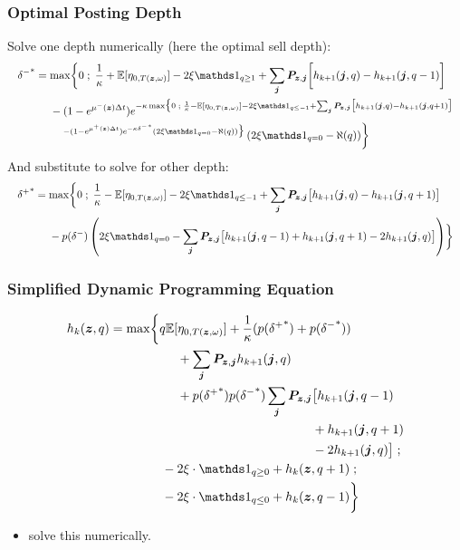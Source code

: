 \begin{frame}
\frametitle{Optimal Posting Depth}
Solve one depth numerically (here the optimal sell depth):
\[
\resizebox{\textwidth}{!}{$\displaystyle
\begin{aligned}
{\delta^-}^* & = \max \biggl\lbrace 0 \; ; \; \frac{1}{\kappa} + \E[\eta_{0,T(\bz, \omega)}] - 2 \xi \indicator_{q \geq 1} + \sum_{\bj} \bP_{\bz,\bj} \biggl[ h_{k+1}(\bj, q) - h_{k+1}(\bj, q-1) \biggr] \\
& \hphantom{{}={}} - (1-e^{\mu^-(\bz) \Delta t})e^{-\kappa \max \bigl\lbrace 0 \; ; \; \frac{1}{\kappa} - \E[\eta_{0,T(\bz, \omega)}] - 2 \xi \indicator_{q \leq -1} + \sum_{\bj} \bP_{\bz,\bj} \bigl[ h_{k+1}(\bj, q) - h_{k+1}(\bj, q+1) \bigr]} \\
& \hphantom{{}={} {}-{}} {}^{-(1-e^{\mu^+ (\bz) \Delta t})e^{-\kappa {\delta^-}^*} \left( 2 \xi \indicator_{q = 0} - \aleph(q) \right) \bigr\rbrace } \left( 2 \xi \indicator_{q = 0} - \aleph(q) \right) \biggr\rbrace
\end{aligned}
$}
\]
And substitute to solve for other depth:
\[
\resizebox{\textwidth}{!}{$\displaystyle 
\begin{aligned}
{\delta^+}^* & = \max \biggl\lbrace 0 \; ; \; \frac{1}{\kappa} - \E[\eta_{0,T(\bz, \omega)}] - 2 \xi \indicator_{q \leq -1} + \sum_{\bj} \bP_{\bz,\bj} \bigl[ h_{k+1}(\bj, q) - h_{k+1}(\bj, q+1) \bigr] \\
& \hphantom{{}={}} -p(\delta^-) \left( 2 \xi \indicator_{q = 0} - \sum_{\bj} \bP_{\bz,\bj} \bigl[ h_{k+1}(\bj, q-1) + h_{k+1}(\bj, q+1) -2 h_{k+1}(\bj, q)  \bigr] \right) \biggr\rbrace
\end{aligned}
$}
\]
\end{frame}

\begin{frame}
\frametitle{Simplified Dynamic Programming Equation}
\[
\begin{aligned}
h_k(\bz,q) & = \max \biggl\lbrace 
q\E[\eta_{0,T(\bz, \omega)}] + \frac{1}{\kappa}(p({\delta^+}^*)+p({\delta^-}^*)) \\
& \hphantom{{}={} \max \biggl\lbrace {}+{}} + \sum_{\bj} \bP_{\bz,\bj} h_{k+1}(\bj,q) \\ 
& \hphantom{{}={} \max \biggl\lbrace {}+{}} + p({\delta^+}^*)p({\delta^-}^*)\sum_{\bj} \bP_{\bz,\bj} \bigl[ h_{k+1}(\bj, q-1) \\
& \hphantom{{}={} \max \biggl\lbrace {}+{} + p({\delta^+}^*)p({\delta^-}^*)\sum_{\bj} \bP_{\bz,\bj}} + h_{k+1}(\bj, q+1) \\
& \hphantom{{}={} \max \biggl\lbrace {}+{} + p({\delta^+}^*)p({\delta^-}^*)\sum_{\bj} \bP_{\bz,\bj}} -2 h_{k+1}(\bj, q)  \bigr] \; ; \\
& \hphantom{{}={} \max \biggl\lbrace } -2\xi \cdot \indicator_{q \geq 0} + h_k(\bz,q+1) \; ; \\
& \hphantom{{}={} \max \biggl\lbrace } -2\xi \cdot \indicator_{q \leq 0} + h_k(\bz,q-1) \biggr\rbrace
\end{aligned}
\]
\begin{itemize}
\item solve this numerically.
\end{itemize}
\end{frame}


